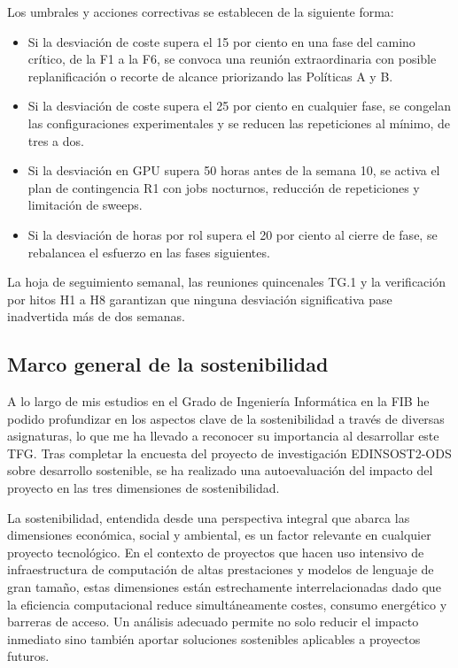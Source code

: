 Los umbrales y acciones correctivas se establecen de la siguiente forma:
\begin{itemize}[nosep]
\item Si la desviación de coste supera el 15 por ciento en una fase del camino crítico, de la F1 a la F6, se convoca una reunión extraordinaria con posible replanificación o recorte de alcance priorizando las Políticas A y B.
\item Si la desviación de coste supera el 25 por ciento en cualquier fase, se congelan las configuraciones experimentales y se reducen las repeticiones al mínimo, de tres a dos.
\item Si la desviación en GPU supera 50 horas antes de la semana 10, se activa el plan de contingencia R1 con jobs nocturnos, reducción de repeticiones y limitación de sweeps.
\item Si la desviación de horas por rol supera el 20 por ciento al cierre de fase, se rebalancea el esfuerzo en las fases siguientes.
\end{itemize}

\noindent La hoja de seguimiento semanal, las reuniones quincenales TG.1 y la verificación por hitos H1 a H8 garantizan que ninguna desviación significativa pase inadvertida más de dos semanas.

\subsection{Marco general de la sostenibilidad}

A lo largo de mis estudios en el Grado de Ingeniería Informática en la FIB he podido profundizar en los aspectos clave de la sostenibilidad a través de diversas asignaturas, lo que me ha llevado a reconocer su importancia al desarrollar este TFG. Tras completar la encuesta del proyecto de investigación EDINSOST2-ODS sobre desarrollo sostenible, se ha realizado una autoevaluación del impacto del proyecto en las tres dimensiones de sostenibilidad.

La sostenibilidad, entendida desde una perspectiva integral que abarca las dimensiones económica, social y ambiental, es un factor relevante en cualquier proyecto tecnológico. En el contexto de proyectos que hacen uso intensivo de infraestructura de computación de altas prestaciones y modelos de lenguaje de gran tamaño, estas dimensiones están estrechamente interrelacionadas dado que la eficiencia computacional reduce simultáneamente costes, consumo energético y barreras de acceso. Un análisis adecuado permite no solo reducir el impacto inmediato sino también aportar soluciones sostenibles aplicables a proyectos futuros.

